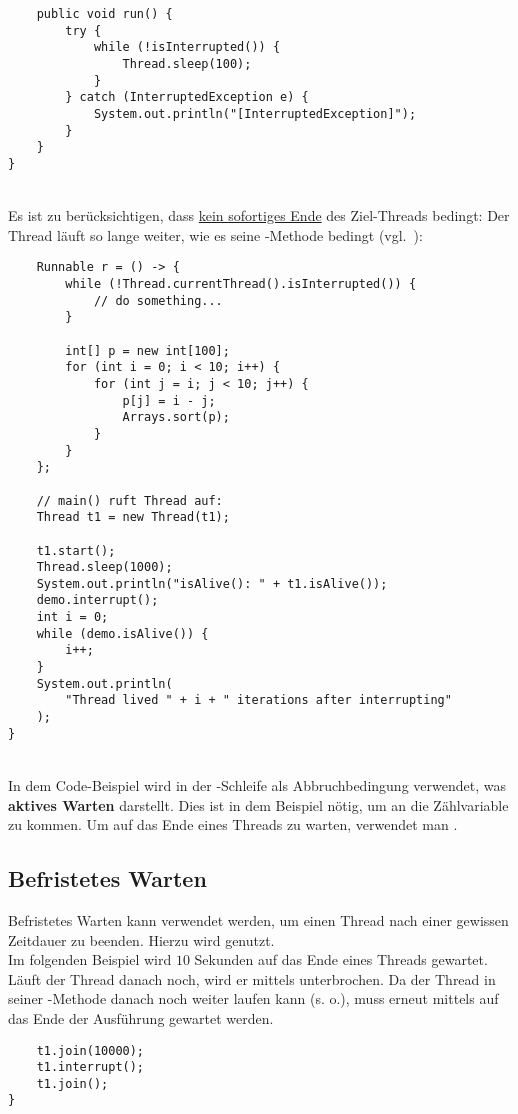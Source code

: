\begin{verbatim}
    public void run() {
        try {
            while (!isInterrupted()) {
                Thread.sleep(100);
            }
        } catch (InterruptedException e) {
            System.out.println("[InterruptedException]");
        }
    }
}
\end{verbatim}\\

Es ist zu berücksichtigen, dass  \underline{kein sofortiges Ende} des Ziel-Threads bedingt: Der Thread läuft so lange weiter, wie es seine -Methode bedingt (vgl.~\cite[44 f.]{Oec22}):


\begin{verbatim}
    Runnable r = () -> {
        while (!Thread.currentThread().isInterrupted()) {
            // do something...
        }

        int[] p = new int[100];
        for (int i = 0; i < 10; i++) {
            for (int j = i; j < 10; j++) {
                p[j] = i - j;
                Arrays.sort(p);
            }
        }
    };

    // main() ruft Thread auf:
    Thread t1 = new Thread(t1);

    t1.start();
    Thread.sleep(1000);
    System.out.println("isAlive(): " + t1.isAlive());
    demo.interrupt();
    int i = 0;
    while (demo.isAlive()) {
        i++;
    }
    System.out.println(
        "Thread lived " + i + " iterations after interrupting"
    );
}
\end{verbatim}\\

In dem Code-Beispiel wird in der -Schleife  als Abbruchbedingung verwendet, was \textbf{aktives Warten} darstellt.
Dies ist in dem Beispiel nötig, um an die Zählvariable zu kommen.
Um auf das Ende eines Threads zu warten, verwendet man .

\subsection*{Befristetes Warten}

Befristetes Warten kann verwendet werden, um einen Thread nach einer gewissen Zeitdauer zu beenden.
Hierzu wird  genutzt.\\
Im folgenden Beispiel wird $10$ Sekunden auf das Ende eines Threads gewartet.
Läuft der Thread danach noch, wird er mittels  unterbrochen.
Da der Thread in seiner  -Methode danach noch weiter laufen kann (s. o.), muss erneut mittels  auf
das Ende der Ausführung gewartet werden.

\begin{verbatim}
    t1.join(10000);
    t1.interrupt();
    t1.join();
}
\end{verbatim}\\